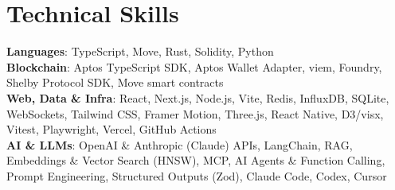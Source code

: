 \documentclass[letterpaper,9pt]{extarticle}
\begin{document}
\section{Technical Skills}
 \begin{itemize}[leftmargin=0.15in, label={}]
    \small{\item{
     \textbf{Languages}{: TypeScript, Move, Rust, Solidity, Python} \\
     \textbf{Blockchain}{: Aptos TypeScript SDK, Aptos Wallet Adapter, viem, Foundry, Shelby Protocol SDK, Move smart contracts} \\
     \textbf{Web, Data \& Infra}{: React, Next.js, Node.js, Vite, Redis, InfluxDB, SQLite, WebSockets, Tailwind CSS, Framer Motion, Three.js, React Native, D3/visx, Vitest, Playwright, Vercel, GitHub Actions} \\
     \textbf{AI \& LLMs}{: OpenAI \& Anthropic (Claude) APIs, LangChain, RAG, Embeddings \& Vector Search (HNSW), MCP, AI Agents \& Function Calling, Prompt Engineering, Structured Outputs (Zod), Claude Code, Codex, Cursor}
    }}
 \end{itemize}
\end{document}
